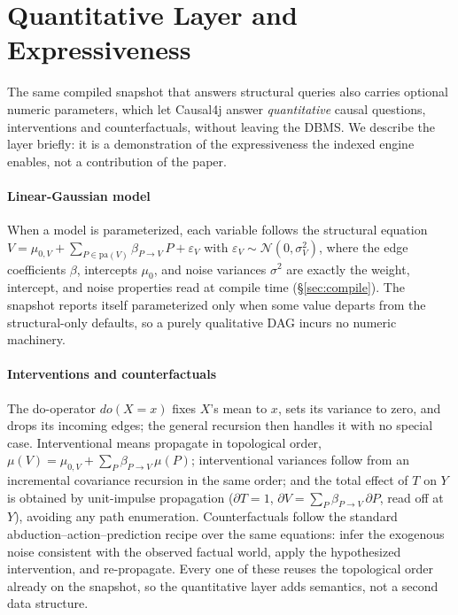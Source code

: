 \section{Quantitative Layer and Expressiveness}\label{sec:quant}

The same compiled snapshot that answers structural queries also carries optional
numeric parameters, which let Causal4j answer \emph{quantitative} causal
questions, interventions and counterfactuals, without leaving the DBMS. We
describe the layer briefly: it is a demonstration of the expressiveness the
indexed engine enables, not a contribution of the paper.

\paragraph{Linear-Gaussian model}
When a model is parameterized, each variable follows the structural equation
$V = \mu_{0,V} + \sum_{P\in\mathrm{pa}(V)} \beta_{P\to V}\,P + \varepsilon_V$ with
$\varepsilon_V\sim\mathcal{N}(0,\sigma^2_V)$, where the edge coefficients
$\beta$, intercepts $\mu_0$, and noise variances $\sigma^2$ are exactly the
\textsf{weight}, \textsf{intercept}, and \textsf{noise} properties read at compile
time (\S\ref{sec:compile}). The snapshot reports itself parameterized only when
some value departs from the structural-only defaults, so a purely qualitative DAG
incurs no numeric machinery.

\paragraph{Interventions and counterfactuals}
The do-operator $do(X{=}x)$ fixes $X$'s mean to $x$, sets its variance to zero,
and drops its incoming edges; the general recursion then handles it with no
special case. Interventional means propagate in topological order,
$\mu(V)=\mu_{0,V}+\sum_P \beta_{P\to V}\,\mu(P)$; interventional variances follow
from an incremental covariance recursion in the same order; and the total effect
of $T$ on $Y$ is obtained by unit-impulse propagation
($\partial T{=}1$, $\partial V=\sum_P \beta_{P\to V}\,\partial P$, read off at
$Y$), avoiding any path enumeration. Counterfactuals follow the standard
abduction--action--prediction recipe over the same equations: infer the exogenous
noise consistent with the observed factual world, apply the hypothesized
intervention, and re-propagate. Every one of these reuses the topological order
already on the snapshot, so the quantitative layer adds semantics, not a second
data structure.

